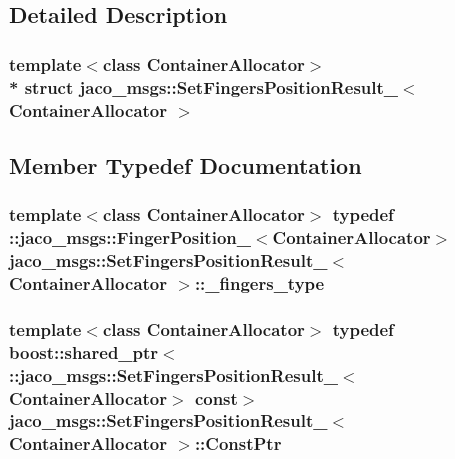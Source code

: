 \subsection{Detailed Description}
\subsubsection*{template$<$class Container\+Allocator$>$\\*
struct jaco\+\_\+msgs\+::\+Set\+Fingers\+Position\+Result\+\_\+$<$ Container\+Allocator $>$}



\subsection{Member Typedef Documentation}
\subsubsection[{\texorpdfstring{\+\_\+fingers\+\_\+type}{_fingers_type}}]{\setlength{\rightskip}{0pt plus 5cm}template$<$class Container\+Allocator$>$ typedef \+::{\bf jaco\+\_\+msgs\+::\+Finger\+Position\+\_\+}$<$Container\+Allocator$>$ {\bf jaco\+\_\+msgs\+::\+Set\+Fingers\+Position\+Result\+\_\+}$<$ Container\+Allocator $>$\+::{\bf \+\_\+fingers\+\_\+type}}\hypertarget{structjaco__msgs_1_1SetFingersPositionResult___ad5514a6c863efc2214b9c9bf723bba78}{}\label{structjaco__msgs_1_1SetFingersPositionResult___ad5514a6c863efc2214b9c9bf723bba78}
\subsubsection[{\texorpdfstring{Const\+Ptr}{ConstPtr}}]{\setlength{\rightskip}{0pt plus 5cm}template$<$class Container\+Allocator$>$ typedef boost\+::shared\+\_\+ptr$<$ \+::{\bf jaco\+\_\+msgs\+::\+Set\+Fingers\+Position\+Result\+\_\+}$<$Container\+Allocator$>$ const$>$ {\bf jaco\+\_\+msgs\+::\+Set\+Fingers\+Position\+Result\+\_\+}$<$ Container\+Allocator $>$\+::{\bf Const\+Ptr}}\hypertarget{structjaco__msgs_1_1SetFingersPositionResult___ac93b14dc1e7dcc93350b9dc71601c7f5}{}\label{structjaco__msgs_1_1SetFingersPositionResult___ac93b14dc1e7dcc93350b9dc71601c7f5}
